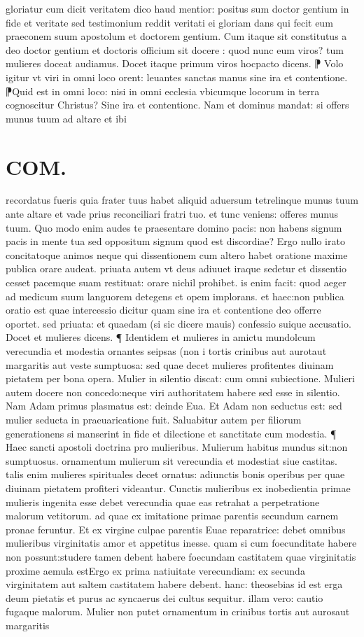 \documentclass{article}
\begin{document}
\begin{pages}
gloriatur cum dicit veritatem dico haud mentior: positus sum doctor gentium in fide et veritate  sed testimonium reddit veritati ei gloriam dans qui fecit eum praeconem suum apostolum  et doctorem gentium. Cum itaque sit constitutus a deo doctor gentium et doctoris officium sit docere : quod nunc eum viros? tum mulieres doceat audiamus. Docet itaque primum viros hocpacto   dicens. ⁋ Volo igitur vt viri in omni loco orent: leuantes sanctas manus sine ira et contentione. ⁋Quid est in omni loco: nisi in omni ecclesia vbicumque locorum in terra cognoscitur Christus? Sine ira et contentionc. Nam et dominus mandat: si offers munus tuum ad altare et ibi  \pend
\section*{COM. }
\marginpar{[ p.2 ]}\pstart recordatus fueris quia frater tuus habet aliquid aduersum tetrelinque munus tuum ante altare et vade prius reconciliari fratri tuo. et tunc veniens: offeres munus tuum. Quo modo enim audes te praesentare domino pacis: non habens signum pacis in mente tua sed oppositum signum quod est discordiae? Ergo nullo irato concitatoque animos neque qui dissentionem cum altero habet oratione maxime publica orare audeat. priuata autem vt deus adiuuet iraque sedetur et dissentio cesset pacemque suam restituat: orare nichil prohibet. is enim facit: quod aeger ad medicum suum languorem detegens et opem implorans. et haec:non publica oratio est quae intercessio dicitur quam sine ira et contentione deo offerre oportet. sed priuata: et quaedam (si sic dicere mauis) confessio suique accusatio. Docet et mulieres dicens. ¶ Identidem et mulieres in amictu mundolcum verecundia et modestia ornantes seipsas (non i tortis crinibus aut aurotaut margaritis aut veste sumptuosa: sed quae  decet mulieres profitentes diuinam pietatem per bona opera. Mulier in silentio discat:  cum omni subiectione. Mulieri autem docere non concedo:neque viri authoritatem habere   sed esse in silentio. Nam Adam primus plasmatus est: deinde Eua. Et Adam non seductus  est: sed mulier seducta in praeuaricatione fuit. Saluabitur autem per filiorum generationens  si manserint in fide et dilectione et sanctitate cum modestia. ¶ Haec sancti apostoli doctrina pro mulieribus. Mulierum habitus mundus sit:non sumptuosus. ornamentum mulierum sit verecundia et modestiat siue castitas. talis enim mulieres spirituales decet ornatus: adiunctis bonis operibus per quae diuinam pietatem profiteri videantur. Cunctis mulieribus ex inobedientia primae mulieris ingenita esse debet verecundia quae eas retrahat a perpetratione malorum vetitorum. ad quae ex imitatione primae parentis secundum carnem pronae feruntur. Et ex virgine culpae parentis Euae reparatrice: debet omnibus mulieribus virginitatis amor et appetitus inesse. quam si cum foecunditate habere non possunt:studere tamen debent habere foecundam castitatem quae virginitatis proxime aemula estErgo ex prima natiuitate verecundiam: ex secunda virginitatem aut saltem castitatem habere debent. hanc: theosebias id est erga deum pietatis et purus ac syncaerus dei cultus sequitur. illam vero: cautio fugaque malorum. Mulier non putet ornamentum in crinibus tortis aut aurosaut margaritis 
\end{pages}
\end{document}
